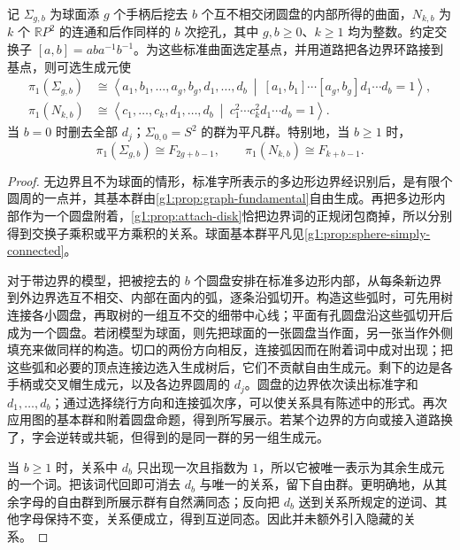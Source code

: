 \begin{proposition}\label{g1:prop:surface-group-presentations}
	记 \(\Sigma_{g,b}\) 为球面添 \(g\) 个手柄后挖去 \(b\) 个互不相交闭圆盘的内部所得的曲面，\(N_{k,b}\) 为 \(k\) 个 \(\mathbb RP^2\) 的连通和后作同样的 \(b\) 次挖孔，其中 \(g,b\ge0\)、\(k\ge1\) 均为整数。约定交换子 \([a,b]=aba^{-1}b^{-1}\)。为这些标准曲面选定基点，并用道路把各边界环路接到基点，则可选生成元使
	\begin{align*}
		\pi_1(\Sigma_{g,b})
		&\cong\left\langle a_1,b_1,\ldots,a_g,b_g,d_1,\ldots,d_b
		\ \middle|\ [a_1,b_1]\cdots[a_g,b_g]d_1\cdots d_b=1\right\rangle,\\
		\pi_1(N_{k,b})
		&\cong\left\langle c_1,\ldots,c_k,d_1,\ldots,d_b
		\ \middle|\ c_1^2\cdots c_k^2d_1\cdots d_b=1\right\rangle.
	\end{align*}
	当 \(b=0\) 时删去全部 \(d_j\)；\(\Sigma_{0,0}=S^2\) 的群为平凡群。特别地，当 \(b\ge1\) 时，
	\[
		\pi_1(\Sigma_{g,b})\cong F_{2g+b-1},\qquad
		\pi_1(N_{k,b})\cong F_{k+b-1}.
	\]
\end{proposition}
\begin{proof}
	无边界且不为球面的情形，标准字所表示的多边形边界经识别后，是有限个圆周的一点并，其基本群由\cref{g1:prop:graph-fundamental}自由生成。再把多边形内部作为一个圆盘附着，\cref{g1:prop:attach-disk}恰把边界词的正规闭包商掉，所以分别得到交换子乘积或平方乘积的关系。球面基本群平凡见\cref{g1:prop:sphere-simply-connected}。

	对于带边界的模型，把被挖去的 \(b\) 个圆盘安排在标准多边形内部，从每条新边界到外边界选互不相交、内部在面内的弧，逐条沿弧切开。构造这些弧时，可先用树连接各小圆盘，再取树的一组互不交的细带中心线；平面有孔圆盘沿这些弧切开后成为一个圆盘。若闭模型为球面，则先把球面的一张圆盘当作面，另一张当作外侧填充来做同样的构造。切口的两份方向相反，连接弧因而在附着词中成对出现；把这些弧和必要的顶点连接边选入生成树后，它们不贡献自由生成元。剩下的边是各手柄或交叉帽生成元，以及各边界圆周的 \(d_j\)。圆盘的边界依次读出标准字和 \(d_1,\ldots,d_b\)；通过选择绕行方向和连接弧次序，可以使关系具有陈述中的形式。再次应用图的基本群和附着圆盘命题，得到所写展示。若某个边界的方向或接入道路换了，字会逆转或共轭，但得到的是同一群的另一组生成元。

	当 \(b\ge1\) 时，关系中 \(d_b\) 只出现一次且指数为 \(1\)，所以它被唯一表示为其余生成元的一个词。把该词代回即可消去 \(d_b\) 与唯一的关系，留下自由群。更明确地，从其余字母的自由群到所展示群有自然满同态；反向把 \(d_b\) 送到关系所规定的逆词、其他字母保持不变，关系便成立，得到互逆同态。因此并未额外引入隐藏的关系。
\end{proof}

